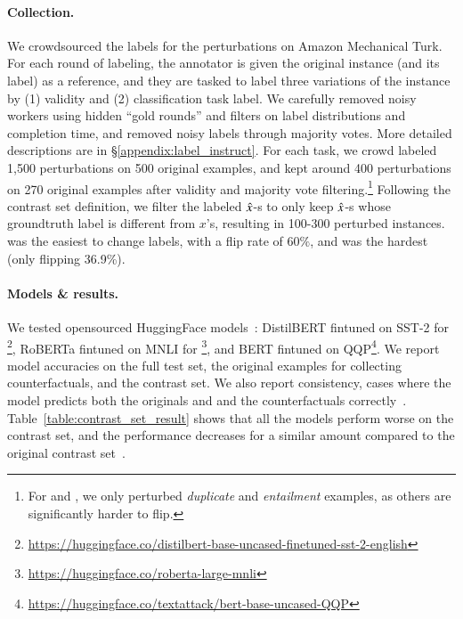 \TableAugSST
\TableAugNLI

\paragraph{Collection.} 
We crowdsourced the labels for the perturbations on Amazon Mechanical Turk. 
For each round of labeling, the annotator is given the original instance (and its label) as a reference, and they are tasked to label three variations of the instance by (1) validity and (2) classification task label. 
We carefully removed noisy workers using hidden ``gold rounds'' and filters on label distributions and completion time, and removed noisy labels through majority votes.
More detailed descriptions are in \S\ref{appendix:label_instruct}. 
For each task, we crowd labeled 1,500 perturbations on 500 original examples, and kept around 400 perturbations on 270 original examples after validity and majority vote filtering.\footnote{For \qqp and \nli, we only perturbed \emph{duplicate} and \emph{entailment} examples, as others are significantly harder to flip.}
Following the contrast set definition, we filter the labeled $\hat{x}$-s to only keep $\hat{x}$-s whose groundtruth label is different from $x$'s, resulting in 100-300 perturbed instances.
\nli was the easiest to change labels, with a flip rate of $60\%$, and \sst was the hardest (only flipping 36.9\%).

\paragraph{Models \& results.}
We tested opensourced HuggingFace models~\cite{Wolf2019HuggingFacesTS}:
DistilBERT fintuned on SST-2 for \sst\footnote{\url{https://huggingface.co/distilbert-base-uncased-finetuned-sst-2-english}},
RoBERTa fintuned on MNLI for \nli\footnote{\url{https://huggingface.co/roberta-large-mnli}},
and BERT fintuned on QQP\footnote{\url{https://huggingface.co/textattack/bert-base-uncased-QQP}}.
We report model accuracies on the full test set, the original examples for collecting counterfactuals, and the contrast set.
We also report consistency, \ie cases where the model predicts both the originals and and the counterfactuals correctly~\cite{li2020linguistically}.
Table~\ref{table:contrast_set_result} shows that all the models perform worse on the contrast set, and the performance decreases for a similar amount compared to the original contrast set~\cite{kaushik2019learning}.


